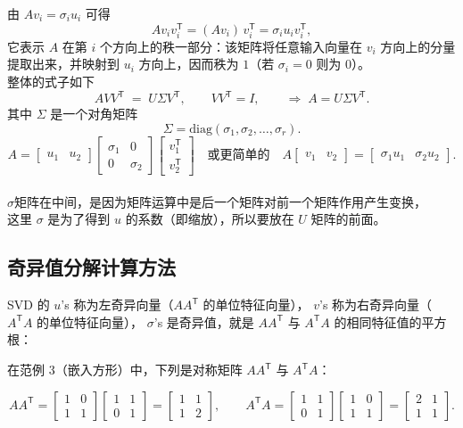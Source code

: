 由 $Av_i=\sigma_i u_i$ 可得
\[
A v_i v_i^{\mathsf T}=(A v_i)\,v_i^{\mathsf T}=\sigma_i u_i v_i^{\mathsf T},
\]
它表示 $A$ 在第 $i$ 个方向上的秩一部分：该矩阵将任意输入向量在 $v_i$ 方向上的分量提取出来，并映射到 $u_i$ 方向上，因而秩为 $1$（若 $\sigma_i=0$ 则为 $0$）。
\\整体的式子如下
\[
A V V^{\mathsf T} \;=\; U \Sigma V^{\mathsf T}, 
\qquad V V^{\mathsf T} = I, 
\qquad \Rightarrow\; A = U \Sigma V^{\mathsf T}.
\]其中 $\Sigma$ 是一个对角矩阵
\[
\Sigma = \mathrm{diag}(\sigma_1, \sigma_2, \dots, \sigma_r).
\]\[
A 
= 
\begin{bmatrix} u_1 & u_2 \end{bmatrix}
\begin{bmatrix} \sigma_1 & 0 \\ 0 & \sigma_2 \end{bmatrix}
\begin{bmatrix} v_1^{\mathsf T} \\ v_2^{\mathsf T} \end{bmatrix}
\quad\text{或更简单的}\quad
A \begin{bmatrix} v_1 & v_2 \end{bmatrix}
= \begin{bmatrix} \sigma_1 u_1 & \sigma_2 u_2 \end{bmatrix}.
\]
\\
$\sigma $矩阵在中间，是因为矩阵运算中是后一个矩阵对前一个矩阵作用产生变换， \\
这里 $\sigma$ 是为了得到 $u$ 的系数（即缩放），所以要放在 $U$ 矩阵的前面。

\subsection{奇异值分解计算方法}
SVD 的 $u$'s 称为左奇异向量（$AA^{\mathsf T}$ 的单位特征向量），
$v$'s 称为右奇异向量（$A^{\mathsf T}A$ 的单位特征向量），
$\sigma$'s 是奇异值，就是 $AA^{\mathsf T}$ 与 $A^{\mathsf T}A$ 的相同特征值的平方根：



在范例 3（嵌入方形）中，下列是对称矩阵 $AA^{\mathsf T}$ 与 $A^{\mathsf T}A$：

\[
AA^{\mathsf T}=
\begin{bmatrix}1&0\\1&1\end{bmatrix}
\begin{bmatrix}1&1\\0&1\end{bmatrix}
=
\begin{bmatrix}1&1\\1&2\end{bmatrix},
\qquad
A^{\mathsf T}A=
\begin{bmatrix}1&1\\0&1\end{bmatrix}
\begin{bmatrix}1&0\\1&1\end{bmatrix}
=
\begin{bmatrix}2&1\\1&1\end{bmatrix}.
\]

